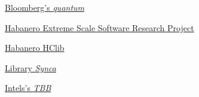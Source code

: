 \begin{thebibliography}{99}
        \href{https://github.com/bloomberg/quantum}
        {Bloomberg's \emph{quantum}}

    \href{https://wiki.rice.edu/confluence/display/HABANERO/Habanero+Extreme+Scale+Software+Research+Project}
        {Habanero Extreme Scale Software Research Project}

    \href{https://github.com/habanero-rice/hclib}
        {Habanero HClib}

        \href{https://github.com/gridem/Synca}
        {Library \emph{Synca}}

        \href{https://github.com/intel/tbb}
        {Intels's \emph{TBB}}

\end{thebibliography}
